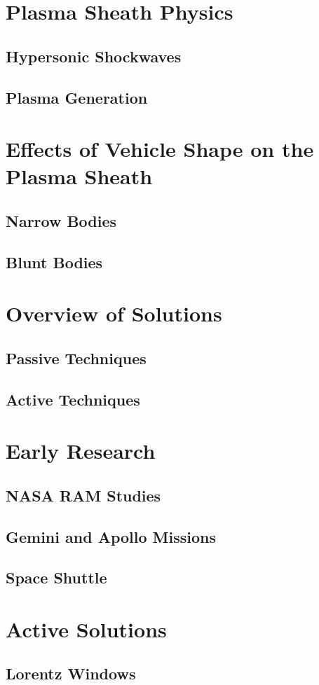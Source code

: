\documentclass[twocolumn]{article}
\begin{document}
\section{Plasma Sheath Physics}
\subsection{Hypersonic Shockwaves}
\subsection{Plasma Generation}


\section{Effects of Vehicle Shape on the Plasma Sheath}
\subsection{Narrow Bodies}
\subsection{Blunt Bodies}


\section{Overview of Solutions}
\subsection{Passive Techniques}
\subsection{Active Techniques}

	
\section{Early Research}
\subsection{NASA RAM Studies}
\subsection{Gemini and Apollo Missions}
\subsection{Space Shuttle}

\section{Active Solutions}
\subsection{Lorentz Windows}
\end{document}
